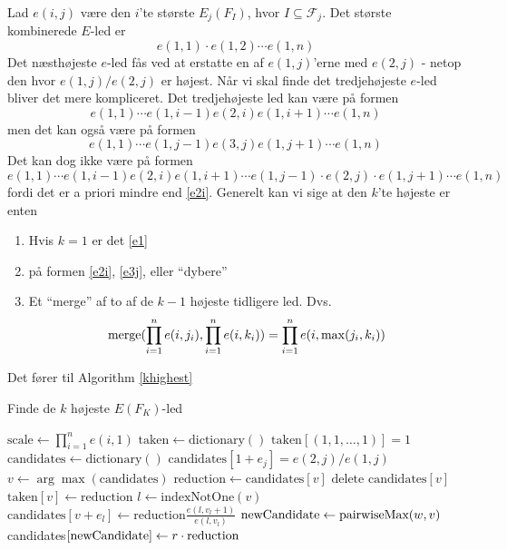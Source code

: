 \documentclass[a4paper, 12pt]{article}
\begin{document}
Lad $e(i,j)$ være den $i$'te største $E_j(F_I)$, hvor $I\subseteq \mathcal F_j$. Det største kombinerede $E$-led er 
\begin{equation}
e(1,1)\cdot e(1,2)\cdots e(1,n) \label{e1}
\end{equation}
Det næsthøjeste $e$-led fås ved at erstatte en af $e(1,j)$'erne med $e(2,j)$ - netop den hvor $e(1,j)/e(2,j)$ er højest. Når vi skal finde det tredjehøjeste $e$-led bliver det mere kompliceret. Det tredjehøjeste led kan være på formen
\begin{equation}
e(1,1) \cdots e(1,i-1) e(2,i) e(1,i+1)\cdots e(1,n) \label{e2i}
\end{equation}
men det kan også være på formen
\begin{equation}
e(1,1) \cdots e(1,j-1) e(3,j) e(1,j+1)\cdots e(1,n)\label{e3j}
\end{equation}
Det kan dog ikke være på formen
\begin{equation}
e(1,1) \cdots e(1,i-1) e(2,i) e(1,i+1)\cdots e(1,j-1) \cdot e(2,j) \cdot e(1,j+1) \cdots e(1,n)
\end{equation}
fordi det er a priori mindre end \eqref{e2i}. Generelt kan vi sige at den $k$'te højeste er enten
\begin{enumerate}
\item
Hvis $k=1$ er det \eqref{e1}
\item
på formen \eqref{e2i}, \eqref{e3j}, eller ``dybere''
\item
Et ``merge'' af to af de $k-1$ højeste tidligere led. Dvs.
\begin{align}
\textup{merge}(\prod_{i=1}^n e(i,j_i), \prod_{i=1}^n e(i,k_i))=\prod_{i=1}^n e(i,\max(j_i,k_i))
\end{align}
\end{enumerate}
Det fører til Algorithm \ref{khighest}

\begin{algorithm}
\caption{Finde de $k$ højeste $E(F_K)$-led}\label{khighest}
\begin{algorithmic}[1]
\State $\text{scale} \gets \prod_{i=1}^n e(i,1)$
\State $\text{taken} \gets \text{dictionary}()$
\State $\text{taken}[(1,1, \dots, 1)]=1$
\State $\text{candidates} \gets \text{dictionary}()$
\State $\text{candidates}[1+e_j]=e(2,j)/e(1,j)$
\EndFor
{}
\State $v\gets \arg \max( \text{candidates})$
\State $\text{reduction} \gets \text{candidates}[v]$
\State $\text{delete candidates}[v]$
\State $\text{taken}[v] \gets \text{reduction}$
\State $l\gets \text{indexNotOne}(v)$
\State $\text{candidates}[v+e_l]\gets \text{reduction}\frac{e(l,v_l+1)}{e(l,v_l)}$
\EndIf
{}
\State $\textup{newCandidate}\gets \textup{pairwiseMax}(w,v)$
\State candidates$[\textup{newCandidate}] \gets r\cdot\text{reduction} $
\EndIf
\EndFor
\EndWhile
\State {}
\EndProcedure
\end{algorithmic}
\end{algorithm}
\end{document}
